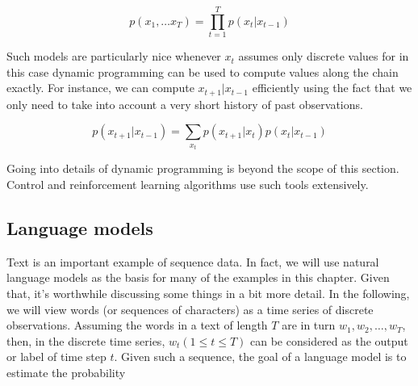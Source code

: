 $$p(x_1, \ldots x_T) = \prod_{t=1}^T p(x_t|x_{t-1})$$

Such models are particularly nice whenever $x_t$ assumes only discrete values for in this case dynamic programming can be used to compute values along the chain exactly. For instance, we can compute $x_{t+1}|x_{t-1}$ efficiently using the fact that we only need to take into account a very short history of past observations.

$$p(x_{t+1}|x_{t-1}) = \sum_{x_t} p(x_{t+1}|x_t) p(x_t|x_{t-1})$$

Going into details of dynamic programming is beyond the scope of this section. Control and reinforcement learning algorithms use such tools extensively.





\subsection{Language models}\label{subsec:lang_models}

Text is an important example of sequence data. In fact, we will use natural language models as the basis for many of the examples in this chapter. Given that, it’s worthwhile discussing some things in a bit more detail. In the following, we will view words (or sequences of characters) as a time series of discrete observations. Assuming the words in a text of length $T$ are in turn $w_1, w_2, \ldots, w_T$, then, in the discrete time series, $w_t(1 \leq t \leq T)$ can be considered as the output or label of time step $t$. Given such a sequence, the goal of a language model is to estimate the probability

